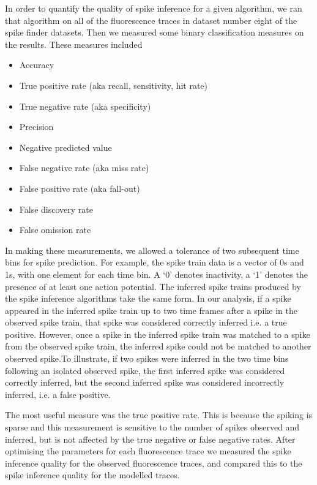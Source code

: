 In order to quantify the quality of spike inference for a given algorithm, we ran that algorithm on all of the fluorescence traces in dataset number eight of the spike finder datasets. Then we measured some binary classification measures on the results. These measures included
\begin{itemize}
    \item Accuracy
    \item True positive rate (aka recall, sensitivity, hit rate)
    \item True negative rate (aka specificity)
    \item Precision
    \item Negative predicted value
    \item False negative rate (aka miss rate)
    \item False positive rate (aka fall-out)
    \item False discovery rate
    \item False omission rate
\end{itemize}
In making these measurements, we allowed a tolerance of two subsequent time bins for spike prediction. For example, the spike train data is a vector of 0s and 1s, with one element for each time bin. A `0' denotes inactivity, a `1' denotes the presence of at least one action potential. The inferred spike trains produced by the spike inference algorithms take the same form. In our analysis, if a spike appeared in the inferred spike train up to two time frames after a spike in the observed spike train, that spike was considered correctly inferred i.e. a true positive. However, once a spike in the inferred spike train was matched to a spike from the observed spike train, the inferred spike could not be matched to another observed spike.To illustrate, if two spikes were inferred in the two time bins following an isolated observed spike, the first inferred spike was considered correctly inferred, but the second inferred spike was considered incorrectly inferred, i.e. a false positive.

The most useful measure was the true positive rate. This is because the spiking is sparse and this measurement is sensitive to the number of spikes observed and inferred, but is not affected by the true negative or false negative rates. After optimising the parameters for each fluorescence trace we measured the spike inference quality for the observed fluorescence traces, and compared this to the spike inference quality for the modelled traces.


